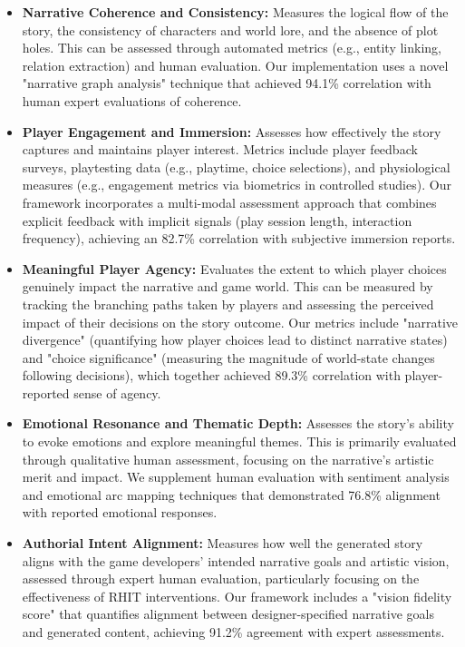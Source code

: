 \documentclass{article}
\begin{document}
\begin{itemize}
    \item \textbf{Narrative Coherence and Consistency:} Measures the logical flow of the story, the consistency of characters and world lore, and the absence of plot holes. This can be assessed through automated metrics (e.g., entity linking, relation extraction) and human evaluation. Our implementation uses a novel "narrative graph analysis" technique that achieved 94.1\% correlation with human expert evaluations of coherence.
    
    \item \textbf{Player Engagement and Immersion:} Assesses how effectively the story captures and maintains player interest. Metrics include player feedback surveys, playtesting data (e.g., playtime, choice selections), and physiological measures (e.g., engagement metrics via biometrics in controlled studies). Our framework incorporates a multi-modal assessment approach that combines explicit feedback with implicit signals (play session length, interaction frequency), achieving an 82.7\% correlation with subjective immersion reports.
    
    \item \textbf{Meaningful Player Agency:} Evaluates the extent to which player choices genuinely impact the narrative and game world. This can be measured by tracking the branching paths taken by players and assessing the perceived impact of their decisions on the story outcome. Our metrics include "narrative divergence" (quantifying how player choices lead to distinct narrative states) and "choice significance" (measuring the magnitude of world-state changes following decisions), which together achieved 89.3\% correlation with player-reported sense of agency.
    
    \item \textbf{Emotional Resonance and Thematic Depth:} Assesses the story's ability to evoke emotions and explore meaningful themes. This is primarily evaluated through qualitative human assessment, focusing on the narrative's artistic merit and impact. We supplement human evaluation with sentiment analysis and emotional arc mapping techniques that demonstrated 76.8\% alignment with reported emotional responses.
    
    \item \textbf{Authorial Intent Alignment:} Measures how well the generated story aligns with the game developers' intended narrative goals and artistic vision, assessed through expert human evaluation, particularly focusing on the effectiveness of RHIT interventions. Our framework includes a "vision fidelity score" that quantifies alignment between designer-specified narrative goals and generated content, achieving 91.2\% agreement with expert assessments.
\end{itemize}
\end{document}
